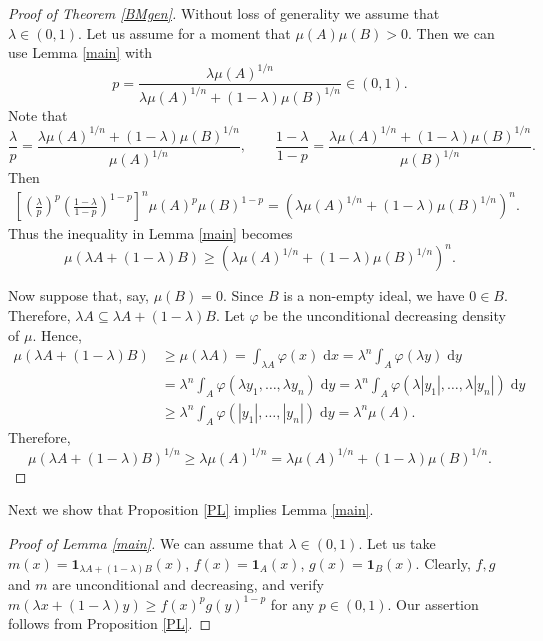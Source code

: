 \documentclass[11pt]{article}
\newcommand{\call}[4]{\int_{#1}^{#2} {#3} \; \textrm{d} {#4}}
\newcommand{\1}{\mathbf{{1}}}
\newcommand{\vp}{\varphi}
\theoremstyle{definition}
\begin{document}
\begin{proof}[Proof of Theorem \ref{BMgen}]
Without loss of generality we assume that $\lambda \in (0,1)$. Let us assume for a moment that $\mu(A)\mu(B)>0$. Then we can use Lemma \ref{main} with
\begin{equation}\label{p}
	p = \frac{\lambda \mu(A)^{1/n}}{\lambda \mu(A)^{1/n} + (1-\lambda) \mu(B)^{1/n}} \in (0,1).
\end{equation}
Note that
\[
	 \frac{\lambda}{p} =  \frac{\lambda \mu(A)^{1/n} + (1-\lambda) \mu(B)^{1/n}}{ \mu(A)^{1/n}}, \qquad  \frac{1-\lambda}{1-p} =  \frac{\lambda \mu(A)^{1/n} + (1-\lambda) \mu(B)^{1/n}}{ \mu(B)^{1/n}}.
\]
Then
\begin{align*}
\left[\left( \frac{\lambda}{p} \right)^{p}  \left( \frac{1-\lambda}{1-p} \right)^{1-p} \right]^n \mu(A)^{p} \mu(B)^{1-p} = \left( \lambda \mu(A)^{1/n} + (1-\lambda) \mu(B)^{1/n} \right)^n.
\end{align*}
Thus the inequality in Lemma \ref{main} becomes
\[
	\mu(\lambda A + (1-\lambda) B) \geq \left( \lambda \mu(A)^{1/n} + (1-\lambda) \mu(B)^{1/n} \right)^n.
\]

Now suppose that, say, $\mu(B)=0$. Since $B$ is a non-empty ideal, we have $0 \in B$. Therefore, $\lambda A \subseteq \lambda A + (1-\lambda) B$. Let $\vp$ be the unconditional decreasing density of $\mu$. Hence,
\begin{align*}
	\mu(\lambda A + (1-\lambda) B) & \geq \mu(\lambda A) = \call{\lambda A}{}{\vp(x)}{x} = \lambda ^n \call{A}{}{\vp(\lambda y)}{y} \\
	& = \lambda ^n \call{A}{}{\vp(\lambda y_1, \ldots, \lambda y_n)}{y} = \lambda ^n \call{A}{}{\vp(\lambda |y_1|, \ldots, \lambda |y_n|)}{y} \\
	& \geq  \lambda ^n \call{A}{}{\vp( |y_1|, \ldots,  |y_n|)}{y} = \lambda^n \mu(A).
\end{align*}
Therefore,
\[
	\mu(\lambda A + (1-\lambda) B)^{1/n} \geq \lambda \mu(A)^{1/n} = \lambda \mu(A)^{1/n} + (1-\lambda) \mu(B)^{1/n}.
\]
\end{proof}

Next we show that Proposition \ref{PL} implies Lemma \ref{main}.

\begin{proof}[Proof of Lemma \ref{main}]
We can assume that $\lambda \in (0,1)$. Let us take $m(x)=\1_{\lambda A + (1-\lambda)B}(x)$, $f(x)=\1_A(x)$, $g(x)=\1_B(x)$. Clearly, $f,g$ and $m$ are unconditional and decreasing, and verify $m(\lambda x + (1-\lambda )y) \geq f(x)^pg(y)^{1-p}$ for any $p \in (0,1)$. Our assertion follows from Proposition \ref{PL}.
\end{proof}
\end{document}
